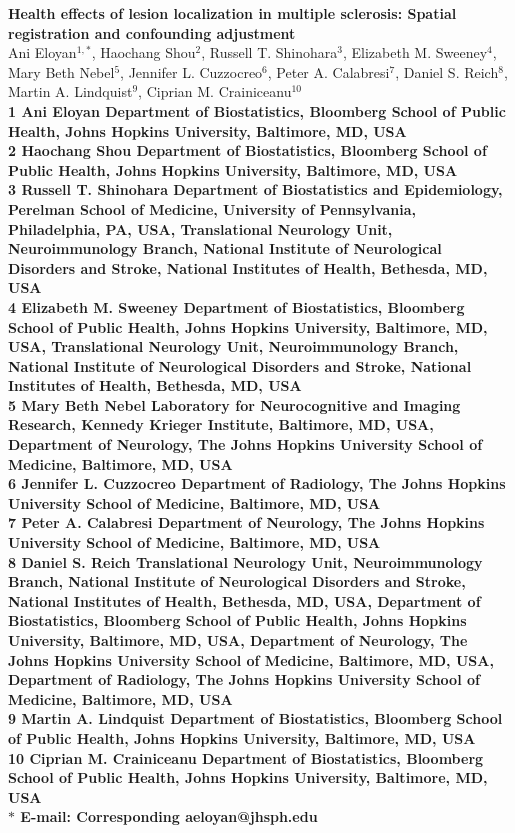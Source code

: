 \documentclass[10pt]{article}
\date{}
\begin{document}
\begin{flushleft}
{\Large
\textbf{Health effects of lesion localization in multiple sclerosis: Spatial registration and confounding adjustment}
}
\\
Ani Eloyan$^{1,\ast}$, 
Haochang Shou$^{2}$, 
Russell T. Shinohara$^{3}$,
Elizabeth M. Sweeney$^{4}$,
Mary Beth Nebel$^{5}$, 
Jennifer L. Cuzzocreo$^{6}$, 
Peter A. Calabresi$^{7}$,
Daniel S. Reich$^{8}$, 
Martin A. Lindquist$^{9}$, 
Ciprian M. Crainiceanu$^{10}$
\\
\bf{1} Ani Eloyan Department of Biostatistics, Bloomberg School of Public Health, Johns Hopkins University, Baltimore, MD, USA
\\
\bf{2} Haochang Shou Department of Biostatistics, Bloomberg School of Public Health, Johns Hopkins University, Baltimore, MD, USA
\\
\bf{3} Russell T. Shinohara Department of Biostatistics and Epidemiology, Perelman School of Medicine, University of Pennsylvania, Philadelphia, PA, USA, Translational Neurology Unit, Neuroimmunology Branch, National Institute of Neurological Disorders and Stroke, National Institutes of Health, Bethesda, MD, USA
\\
\bf{4} Elizabeth M. Sweeney Department of Biostatistics, Bloomberg School of Public Health, Johns Hopkins University, Baltimore, MD, USA, Translational Neurology Unit, Neuroimmunology Branch, National Institute of Neurological Disorders and Stroke, National Institutes of Health, Bethesda, MD, USA
\\
\bf{5} Mary Beth Nebel Laboratory for Neurocognitive and Imaging Research, Kennedy Krieger Institute, Baltimore, MD, USA, Department of Neurology, The Johns Hopkins University School of Medicine,  Baltimore, MD, USA
\\
\bf{6} Jennifer L. Cuzzocreo Department of Radiology, The Johns Hopkins University School of Medicine, Baltimore, MD, USA
\\
\bf{7} Peter A. Calabresi Department of Neurology, The Johns Hopkins University School of Medicine, Baltimore, MD, USA
\\
\bf{8} Daniel S. Reich Translational Neurology Unit, Neuroimmunology Branch, National Institute of Neurological Disorders and Stroke, National Institutes of Health, Bethesda, MD, USA, Department of Biostatistics, Bloomberg School of Public Health, Johns Hopkins University, Baltimore, MD, USA, Department of Neurology, The Johns Hopkins University School of Medicine,  Baltimore, MD, USA, Department of Radiology, The Johns Hopkins University School of Medicine, Baltimore, MD, USA
\\
\bf{9} Martin A. Lindquist Department of Biostatistics, Bloomberg School of Public Health, Johns Hopkins University, Baltimore, MD, USA
\\
\bf{10} Ciprian M. Crainiceanu Department of Biostatistics, Bloomberg School of Public Health, Johns Hopkins University, Baltimore, MD, USA
\\
$\ast$ E-mail: Corresponding aeloyan@jhsph.edu
\end{flushleft}
\end{document}
